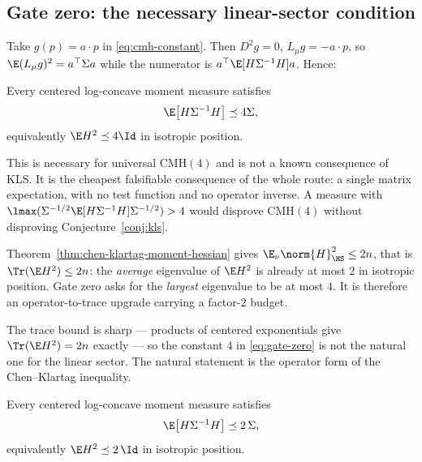 \documentclass[../../main.tex]{subfiles}
\begin{document}
\subsection{Gate zero: the necessary linear-sector condition}
\label{subsec:gate-zero}

Take $g(p)=a\cdot p$ in \eqref{eq:cmh-constant}. Then $D^2g=0$, $L_\mu g=-a\cdot p$, so
$\E(L_\mu g)^2=a^\top\Sigma a$ while the numerator is $a^\top\E[H\Sigma^{-1}H]a$. Hence:

\begin{conjecture}
\label{conj:gate-zero}
Every centered log-concave moment measure satisfies
\begin{equation}
  \E\bigl[H\Sigma^{-1}H\bigr]\preceq4\Sigma,
  \label{eq:gate-zero}
\end{equation}
equivalently $\E H^2\preceq4\Id$ in isotropic position.
\end{conjecture}

This is necessary for universal $\mathrm{CMH}(4)$ and is not a known consequence of KLS. It is
the cheapest falsifiable consequence of the whole route: a single matrix expectation, with no
test function and no operator inverse. A measure with
$\lmax(\Sigma^{-1/2}\E[H\Sigma^{-1}H]\Sigma^{-1/2})>4$ would disprove $\mathrm{CMH}(4)$ without
disproving Conjecture~\ref{conj:kls}.

\begin{corollary}
\label{rem:gate-zero-trace-upgrade}
Theorem~\ref{thm:chen-klartag-moment-hessian} gives
$\E_\nu\norm{H}_{\HS}^2\le2n$, that is $\Tr(\E H^2)\le2n$: the \emph{average} eigenvalue of
$\E H^2$ is already at most $2$ in isotropic position. Gate zero asks for the \emph{largest}
eigenvalue to be at most $4$. It is therefore an operator-to-trace upgrade carrying a factor-$2$
budget.
\end{corollary}

The trace bound is sharp --- products of centered exponentials give $\Tr(\E H^2)=2n$ exactly
--- so the constant $4$ in \eqref{eq:gate-zero} is not the natural one for the linear sector.
The natural statement is the operator form of the Chen--Klartag inequality.

\begin{conjecture}
\label{conj:gate-zero-sharp}
Every centered log-concave moment measure satisfies
\begin{equation}
  \E\bigl[H\Sigma^{-1}H\bigr]\preceq2\,\Sigma,
  \label{eq:gate-zero-sharp}
\end{equation}
equivalently $\E H^2\preceq2\,\Id$ in isotropic position.
\end{conjecture}
\end{document}
